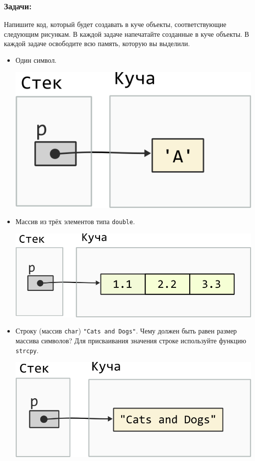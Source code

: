 \documentclass{article}
\begin{document}
\newpage
\subsubsection*{Задачи:}

Напишите код, который будет создавать в куче объекты, соответствующие следующим рисункам. В каждой задаче напечатайте созданные в куче объекты. В каждой задаче освободите всю память, которую вы выделили.
\begin{itemize}
\item Один символ.
\begin{center}
\includegraphics[scale=0.72]{../images/malloc_class_tasks/heap_char.png}
\end{center}


\item Массив из трёх элементов типа \texttt{double}.
\begin{center}
\includegraphics[scale=0.72]{../images/malloc_class_tasks/heap_double_array.png}
\end{center}

\item Строку (массив \texttt{char}) \texttt{"Cats and Dogs"}. Чему должен быть равен размер массива символов? Для присваивания значения строке используйте функцию \texttt{strcpy}.
\begin{center}
\includegraphics[scale=0.72]{../images/malloc_class_tasks/heap_char_array.png}
\end{center}



\end{itemize}
\end{document}
